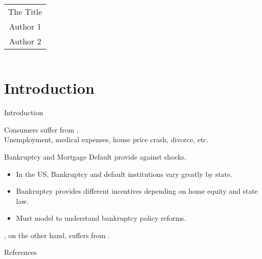 \documentclass{beamer}
\begin{document}
\title{%
\begin{tabular}{c}
\\ 
The Title
 \\
{\small Author 1}\\
{\small Author 2}
\end{tabular}%
}




\frame{\titlepage} 

\section{Introduction}

\begin{frame}{Introduction}
\begin{midi}
\item<1-> Consumers suffer from .\\
{\small Unemployment, medical expenses, house price crash, divorce, etc.}
\item<2-> Bankruptcy and Mortgage Default provide  against shocks.
\begin{itemize}
\item In the US, Bankruptcy and default institutions vary greatly by state.
\item Bankruptcy provides different incentives depending on home equity and state law.
\item Must model  to understand bankruptcy policy reforms.
\end{itemize}
\item<3-> , on the other hand, suffers from .
\end{midi}
\end{frame}









\begin{frame}[allowframebreaks]{References}
		
		
\end{frame}
\end{document}
